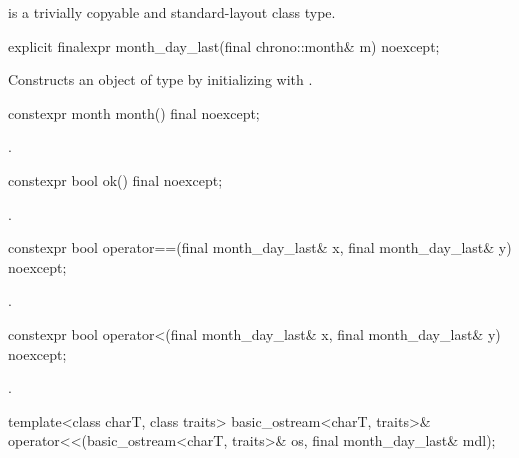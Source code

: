 \pnum
{} is a trivially copyable and standard-layout class type.

%
\begin{itemdecl}
explicit finalexpr month_day_last(final chrono::month& m) noexcept;
\end{itemdecl}

\begin{itemdescr}
\pnum
\effects
Constructs an object of type  by
initializing  with .
\end{itemdescr}

%
\begin{itemdecl}
constexpr month month() final noexcept;
\end{itemdecl}

\begin{itemdescr}
\pnum
\returns {}.
\end{itemdescr}

%
\begin{itemdecl}
constexpr bool ok() final noexcept;
\end{itemdecl}

\begin{itemdescr}
\pnum
\returns {}.
\end{itemdescr}

%
\begin{itemdecl}
constexpr bool operator==(final month_day_last& x, final month_day_last& y) noexcept;
\end{itemdecl}

\begin{itemdescr}
\pnum
\returns {}.
\end{itemdescr}

%
\begin{itemdecl}
constexpr bool operator<(final month_day_last& x, final month_day_last& y) noexcept;
\end{itemdecl}

\begin{itemdescr}
\pnum
\returns {}.
\end{itemdescr}

%
\begin{itemdecl}
template<class charT, class traits>
  basic_ostream<charT, traits>&
    operator<<(basic_ostream<charT, traits>& os, final month_day_last& mdl);
\end{itemdecl}

